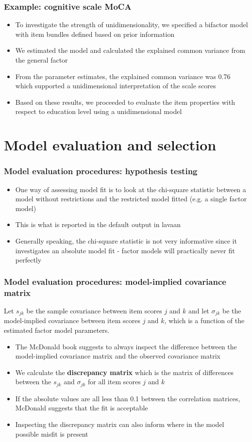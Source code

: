 \documentclass[compress]{beamer}
\begin{document}
\begin{frame}[fragile]
\frametitle{Example: cognitive scale MoCA}
\begin{itemize}
\item To investigate the strength of unidimensionality, we specified a bifactor model with item bundles defined based on prior information
\item We estimated the model and calculated the explained common variance from the general factor\item From the parameter estimates, the explained common variance was 0.76 which supported a unidimensional interpretation of the scale scores
\item Based on these results, we proceeded to evaluate the item properties with respect to education level using a unidimensional model
\end{itemize}
\end{frame}

\section{Model evaluation and selection}
\begin{frame}[fragile]
\frametitle{Model evaluation procedures: hypothesis testing}
\begin{itemize}
\item One way of assessing model fit is to look at the chi-square statistic between a model without restrictions and the restricted model fitted (e.g. a single factor model)
\item This is what is reported in the default output in lavaan
\item Generally speaking, the chi-square statistic is not very informative since it investigates an absolute model fit - factor models will practically never fit perfectly
\end{itemize}
\end{frame}

\begin{frame}[fragile]
\frametitle{Model evaluation procedures: model-implied covariance matrix}
Let $s_{jk}$ be the sample covariance between item scores $j$ and $k$ and let $\sigma_{jk}$ be the model-implied covariance between item scores $j$ and $k$, which is a function of the estimated factor model parameters. 
\begin{itemize}
\item The McDonald book suggests to always inspect the difference between the model-implied covariance matrix and the observed covariance matrix
\item We calculate the \textbf{discrepancy matrix} which is the matrix of differences between the $s_{jk}$ and $\sigma_{jk}$ for all item scores $j$ and $k$
\item If the absolute values are all less than 0.1 between the correlation matrices, McDonald suggests that the fit is acceptable
\item Inspecting the discrepancy matrix can also inform where in the model possible misfit is present
\end{itemize}
\end{frame}
\end{document}
